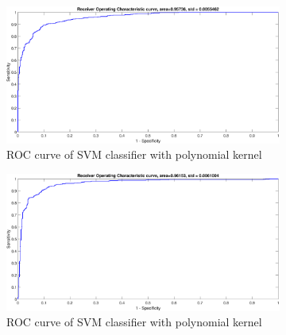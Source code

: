 {\begin{table}[!htpb]
\end{table}
\begin{figure}[!ht] 
	\centering
	\begin{subfigure}{.35\textwidth}
		\centering
		\captionsetup{width=0.8\linewidth}
		\includegraphics[height=.65\linewidth, width=0.9\linewidth]{Exercise1/Report/ripley/ripley_lin_ROC.eps}
		\caption{ROC curve of SVM classifier with polynomial kernel}
		\label{fig:ripley_lin_ROC}
	\end{subfigure}%
	\begin{subfigure}{.35\textwidth}
		\centering
		\captionsetup{width=0.8\linewidth}
		\includegraphics[height=.65\linewidth, width=0.9\linewidth]{Exercise1/Report/ripley/ripley_poly_ROC.eps}
		\caption{ROC curve of SVM classifier with polynomial kernel}
		\label{fig:ripley_poly_ROC}
	\end{subfigure}%
	\begin{subfigure}{.35\textwidth}
		\centering

\end{subfigure}
\end{figure}}
